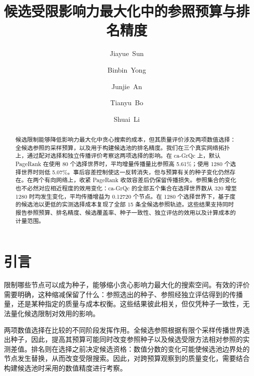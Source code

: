 \documentclass[smallextended]{svjour3}
\begin{document}
\def\abstractname{摘要}
\def\keywordname{\textbf{关键词}}
\def\figurename{图}
\def\tablename{表}
\def\refname{参考文献}

\title{候选受限影响力最大化中的参照预算与排名精度}
\author{\mbox{Jiayue Sun} \and \mbox{Binbin Yong} \and \mbox{Junjie An} \and \mbox{Tianyu Bo} \and \mbox{Shuai Li}}
\date{}
\maketitle
\begin{abstract}
候选限制能够降低影响力最大化中贪心搜索的成本，但其质量评价涉及两项数值选择：全候选参照的采样预算，以及用于构建候选池的排名精度。我们在三个真实网络拓扑上，通过配对选择和独立传播评价考察这两项选择的影响。在 ca-GrQc 上，默认 PageRank 在使用 80 个选择世界时，平均增量传播量比参照高 5.61\%；使用 1280 个选择世界时则低 5.07\%。事后容差控制使这一反转消失，但与预算有关的种子变化仍然存在。在两个有向网络上，收紧 PageRank 收敛容差后仍保留传播损失。参照集合的变化也不必然对应相近程度的效用变化：ca-GrQc 的全部五个集合在选择世界数从 320 增至 1280 时均发生变化，平均传播增益为 0.12720 个节点。在 1280 个选择世界下，基于度的候选池以更低的实测选择成本复现了全部 15 条全候选参照轨迹。这些结果支持同时报告参照预算、排名精度、候选覆盖率、种子一致性、独立评估的效用以及计算成本的计量范围。
\end{abstract}

\section{引言}
限制哪些节点可以成为种子，能够缩小贪心影响力最大化的搜索空间。有效的评价需要明确，这种缩减保留了什么：参照选出的种子、参照经独立评估得到的传播量，还是某种指定的质量与成本权衡。这些结果彼此相关，但仅凭种子一致性，无法量化候选限制对效用的影响。

两项数值选择在比较的不同阶段发挥作用。全候选参照根据有限个采样传播世界选出种子，因此，提高其预算可能同时改变参照种子以及候选受限方法相对参照的实测差值。排名则在选择之前决定候选资格：数值分数的变化可能使候选池边界处的节点发生替换，从而改变受限搜索。因此，对跨预算观察到的质量变化，需要结合构建候选池时采用的数值精度进行考察。
\end{document}
